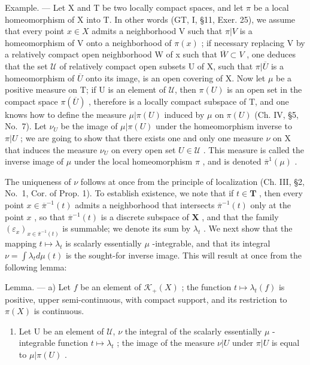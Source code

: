 Example. --- Let X and T be two locally compact spaces, and let \(\pi\) be a local homeomorphism of X into T. In other words (GT, I, §11, Exer. 25), we assume that every point \(x \in X\) admits a neighborhood V such that \(\pi|V\) is a homeomorphism of V onto a neighborhood of \(\pi(x)\) ; if necessary replacing V by a relatively compact open neighborhood W of x such that \(\overline{W} \subset V\) , one deduces that the set \(\mathcal{U}\) of relatively compact open subsets U of X, such that \(\pi|\overline{U}\) is a homeomorphism of \(\overline{U}\) onto its image, is an open covering of X. Now let \(\mu\) be a positive measure on T; if U is an element of \(\mathcal{U}\), then \(\pi(U)\) is an open set in the compact space \(\pi(\overline{U})\) , therefore is a locally compact subspace of T, and one knows how to define the measure \(\mu|\pi(U)\) induced by \(\mu\) on \(\pi(U)\) (Ch. IV, §5, No.~7). Let \(\nu_{U}\) be the image of \(\mu|\pi(U)\) under the homeomorphism inverse to \(\pi|U\) ; we are going to show that there exists one and only one measure \(\nu\) on X that induces the measure \(\nu_{U}\) on every open set \(U \in \mathcal{U}\) . This measure is called the inverse image of \(\mu\) under the local homeomorphism \(\pi\) , and is denoted \(\overline{\pi}^{1}(\mu)\) .

The uniqueness of \(\nu\) follows at once from the principle of localization (Ch. III, §2, No.~1, Cor. of Prop. 1). To establish existence, we note that if \(t \in \mathbf{T}\) , then every point \(x \in \overline{\pi}^{-1}(t)\) admits a neighborhood that intersects \(\overline{\pi}^{-1}(t)\) only at the point \(x\) , so that \(\overline{\pi}^{-1}(t)\) is a discrete subspace of \(\mathbf{X}\) , and that the family \((\varepsilon_x)_{x \in \overline{\pi}^{-1}(t)}\) is summable; we denote its sum by \(\lambda_t\) . We next show that the mapping \(t \mapsto \lambda_t\) is scalarly essentially \(\mu\) -integrable, and that its integral \(\nu = \int \lambda_t d\mu(t)\) is the sought-for inverse image. This will result at once from the following lemma:

Lemma. --- a) Let \(f\) be an element of \(\mathcal{K}_{+}(X)\) ; the function \(t \mapsto \lambda_{t}(f)\) is positive, upper semi-continuous, with compact support, and its restriction to \(\pi(X)\) is continuous.

\begin{enumerate}
\def\labelenumi{\alph{enumi})}
\setcounter{enumi}{1}
\tightlist
\item
  Let U be an element of \(\mathcal{U}\), \(\nu\) the integral of the scalarly essentially \(\mu\) -integrable function \(t \mapsto \lambda_{t}\) ; the image of the measure \(\nu|U\) under \(\pi|U\) is equal to \(\mu|\pi(U)\) .
\end{enumerate}

